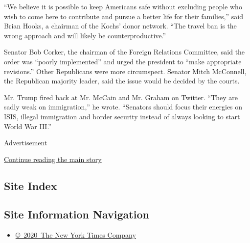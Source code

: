 ``We believe it is possible to keep Americans safe without excluding
people who wish to come here to contribute and pursue a better life for
their families,'' said Brian Hooks, a chairman of the Kochs' donor
network. ``The travel ban is the wrong approach and will likely be
counterproductive.''

Senator Bob Corker, the chairman of the Foreign Relations Committee,
said the order was ``poorly implemented'' and urged the president to
``make appropriate revisions.'' Other Republicans were more circumspect.
Senator Mitch McConnell, the Republican majority leader, said the issue
would be decided by the courts.

Mr. Trump fired back at Mr. McCain and Mr. Graham on Twitter. ``They are
sadly weak on immigration,'' he wrote. ``Senators should focus their
energies on ISIS, illegal immigration and border security instead of
always looking to start World War III.''

Advertisement

\protect\hyperlink{after-bottom}{Continue reading the main story}

\hypertarget{site-index}{%
\subsection{Site Index}\label{site-index}}

\hypertarget{site-information-navigation}{%
\subsection{Site Information
Navigation}\label{site-information-navigation}}

\begin{itemize}
\tightlist
\item
  \href{https://help.nytimes.com/hc/en-us/articles/115014792127-Copyright-notice}{©~2020~The
  New York Times Company}
\end{itemize}

